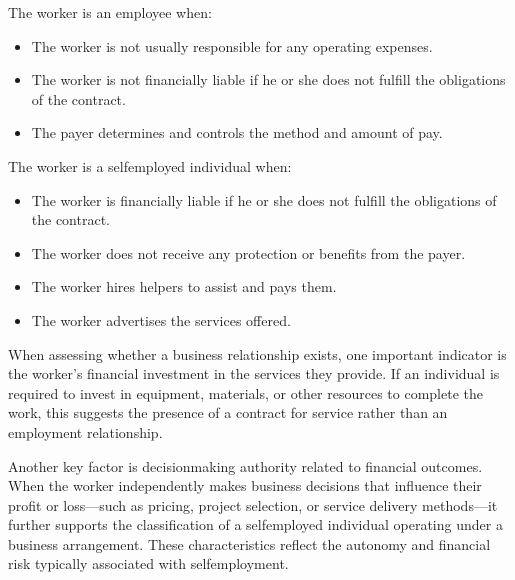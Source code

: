 \documentclass[letterpaper,10pt,english]{sphinxmanual}
\begin{document}
\sphinxAtStartPar
The worker is an employee when:
\begin{itemize}
\item {} 
\sphinxAtStartPar
The worker is not usually responsible for any operating expenses.

\item {} 
\sphinxAtStartPar
The worker is not financially liable if he or she does not fulfill the obligations of the contract.

\item {} 
\sphinxAtStartPar
The payer determines and controls the method and amount of pay.

\end{itemize}

\sphinxAtStartPar
The worker is a self\sphinxhyphen{}employed individual when:
\begin{itemize}
\item {} 
\sphinxAtStartPar
The worker is financially liable if he or she does not fulfill the obligations of the contract.

\item {} 
\sphinxAtStartPar
The worker does not receive any protection or benefits from the payer.

\item {} 
\sphinxAtStartPar
The worker hires helpers to assist and pays them.

\item {} 
\sphinxAtStartPar
The worker advertises the services offered.

\end{itemize}

\sphinxAtStartPar
{}

\sphinxAtStartPar
When assessing whether a business relationship exists, one important indicator is the worker’s financial investment in the
services they provide. If an individual is required to invest in equipment, materials, or other resources to complete the
work, this suggests the presence of a contract for service rather than an employment relationship.

\sphinxAtStartPar
Another key factor is decision\sphinxhyphen{}making authority related to financial outcomes. When the worker independently makes business
decisions that influence their profit or loss—such as pricing, project selection, or service delivery methods—it further
supports the classification of a self\sphinxhyphen{}employed individual operating under a business arrangement. These characteristics
reflect the autonomy and financial risk typically associated with self\sphinxhyphen{}employment.
\end{document}
